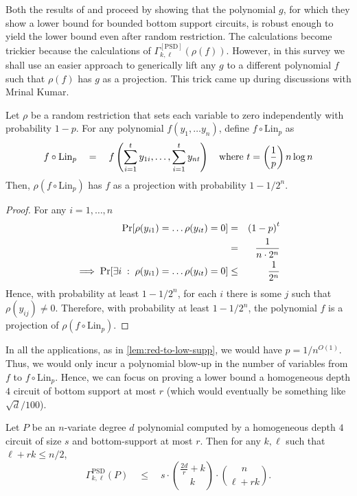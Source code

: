 Both the results of \cite{KLSS} and \cite{KS14} proceed by showing that the polynomial $g$, for which they show a lower bound for bounded bottom support circuits, is robust enough to yield the lower bound even after random restriction. 
The calculations become trickier because the calculations of $\Gamma^{[\mathrm{PSD}]}_{k,\ell}(\rho(f))$. 
However, in this survey we shall use an easier approach to generically lift any $g$ to a different polynomial $f$ such that $\rho(f)$ has $g$ as a projection. 
This trick came up during discussions with Mrinal Kumar. 

\begin{lemma}\label{lem:lin-transform-trick}
Let $\rho$ be a random restriction that sets each variable to zero independently with probability $1 - p$. 
For any polynomial $f(y_1,\dots y_n)$, define $f \circ \mathrm{Lin}_p$ as
\[
f \circ \mathrm{Lin}_p \quad = \quad f\left(\sum_{i=1}^t y_{1i}, \ldots, \sum_{i=1}^t y_{nt}\right)\quad \text{where $t = \left(\frac{1}{p}\right) n \log n$}
\]
Then, $\rho(f \circ \mathrm{Lin}_p)$ has $f$ as a projection with probability $1 - 1/2^{n}$. 
\end{lemma}
\begin{proof} For any $i = 1, \dots, n$
\begin{eqnarray*}
\quad \Pr[\rho(y_{i1}) = \dots \rho(y_{it}) = 0 ] & = & \left(1 - p\right)^t\\ 
& = & \frac{1}{n\cdot 2^n}\\
\implies \Pr[\exists i\;:\;\rho(y_{i1}) = \dots \rho(y_{it}) = 0 ]  & \leq  & \frac{1}{2^n} 
\end{eqnarray*}
Hence, with probability at least $1 - 1/2^n$, for each $i$ there is some $j$ such that $\rho(y_{ij}) \neq 0$. 
Therefore, with probability at least $1 - 1/2^n$, the polynomial $f$ is a projection of $\rho(f \circ \mathrm{Lin}_p)$. \end{proof}

In all the applications, as in \autoref{lem:red-to-low-supp}, we would have $p = 1/n^{O(1)}$. 
Thus, we would only incur a polynomial blow-up in the number of variables from $f$ to $f\circ \mathrm{Lin}_p$. 
Hence, we can focus on proving a lower bound  a homogeneous depth $4$ circuit of bottom support at most $r$ (which would eventually be something like $\sqrt{d}/100$). 

\begin{lemma}\label{lem:upper-bound-low-supp}
Let $P$ be an $n$-variate degree $d$ polynomial computed by a homogeneous depth $4$ circuit of size $s$ and bottom-support at most $r$. 
Then for any $k,\ell$ such that $\ell + rk \leq n/2$, 
\[
\Gamma^{\mathrm{PSD}}_{k,\ell}(P) \quad \leq \quad s \cdot \binom{\frac{2d}{r}+k}{k}\cdot \binom{n}{\ell+rk}. 
\]
\end{lemma}

